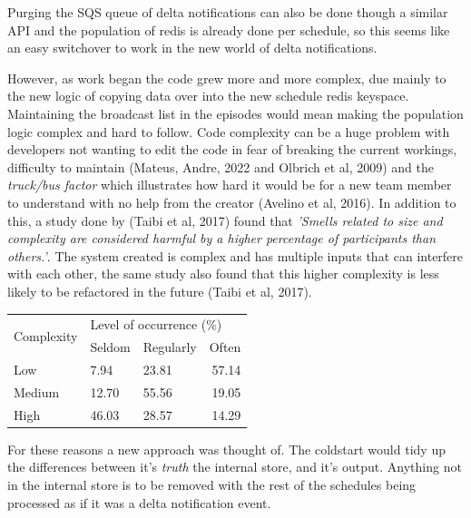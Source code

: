   Purging the SQS queue of delta notifications can also be done though a similar API and the population of redis is already done per schedule, so 
  this seems like an easy switchover to work in the new world of delta notifications.

  However, as work began the code grew more and more complex, due mainly to the new logic of copying data over into the new schedule redis keyspace.
  Maintaining the broadcast list in the episodes would mean making the population logic complex and hard to follow. Code complexity can be a huge 
  problem with developers not wanting to edit the code in fear of breaking the current workings, difficulty to maintain 
  (Mateus, Andre, 2022 and Olbrich et al, 2009) and the \textit{truck/bus factor} which illustrates how hard it would be for a new team member to 
  understand with no help from the creator (Avelino et al, 2016). In addition to this, a study done by (Taibi et al, 2017) found that 
  \textit{'Smells related to size and complexity are considered harmful by a higher percentage of participants than others.'}. The system created is 
  complex and has multiple inputs that can interfere with each other, the same study also found that this higher complexity is less likely to be 
  refactored in the future (Taibi et al, 2017).

\begin{table}[H]
  \centering
  \begin{tabular}{|l|llr|}
  \hline
  \multicolumn{1}{|c|}{\multirow{2}{*}{Complexity}} & \multicolumn{3}{l|}{Level of occurrence (\%)}                        \\ \cline{2-4} 
  \multicolumn{1}{|c|}{}                            & \multicolumn{1}{l|}{Seldom} & \multicolumn{1}{l|}{Regularly} & Often \\ \hline
  Low                                               & \multicolumn{1}{l|}{7.94}   & \multicolumn{1}{l|}{23.81}     & 57.14 \\ \hline
  Medium                                            & \multicolumn{1}{l|}{12.70}  & \multicolumn{1}{l|}{55.56}     & 19.05 \\ \hline
  High                                              & \multicolumn{1}{l|}{46.03}  & \multicolumn{1}{l|}{28.57}     & 14.29 \\ \hline
  \end{tabular}
  \end{table}

  For these reasons a new approach was thought of. The coldstart would tidy up the differences between it's \textit{truth} the internal store, and 
  it's output. Anything not in the internal store is to be removed with the rest of the schedules being processed as if it was a delta notification 
  event.

